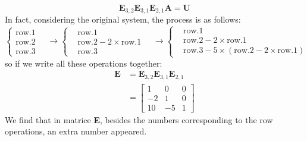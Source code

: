             \begin{equation}
                \mathbf{E}_{3,2} \mathbf{E}_{3,1} \mathbf{E}_{2,1} \mathbf{A} = \mathbf{U}
            \end{equation}
        In fact, considering the original system, the process is as follows:
            \begin{equation}
                \left\{
                \begin{aligned}
                    \mathrm{row}.1\\
                    \mathrm{row}.2\\
                    \mathrm{row}.3
                \end{aligned}
                \right.
                \quad \rightarrow
                \left\{
                \begin{aligned}
                    &\mathrm{row}.1\\
                    &\mathrm{row}.2 - 2\times \mathrm{row}.1\\
                    &\mathrm{row}.3
                \end{aligned}
                \right.
                \quad \rightarrow
                \left\{
                \begin{aligned}
                    &\mathrm{row}.1\\
                    &\mathrm{row}.2 - 2\times \mathrm{row}.1 \\
                    &\mathrm{row}.3 - 5\times (\mathrm{row}.2 - 2\times \mathrm{row}.1)
                \end{aligned}
                \right.
            \end{equation}
        so if we write all these operations together:
            \begin{equation}
                \begin{aligned}
                \mathbf{E} &= \mathbf{E}_{3,2} \mathbf{E}_{3,1} \mathbf{E}_{2,1}\\
                           &= 
                           \begin{bmatrix}
                                1 & 0 & 0\\
                                -2 & 1 & 0\\
                                \boxed{10} & -5 & 1
                              \end{bmatrix}              
                \end{aligned}
            \end{equation}
        We find that in matrice \textbf{E}, besides the numbers corresponding to the row operations, 
        an extra number appeared.


